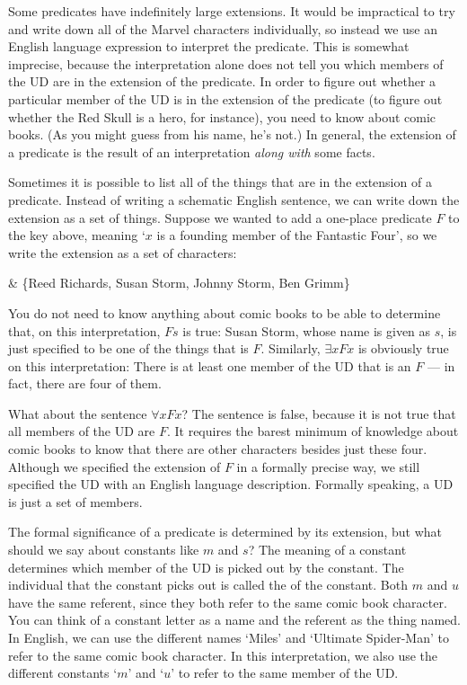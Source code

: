 Some predicates have indefinitely large extensions. It would be impractical to try and write down all of the Marvel characters individually, so instead we use an English language expression to interpret the predicate. This is somewhat imprecise, because the interpretation alone does not tell you which members of the UD are in the extension of the predicate. In order to figure out whether a particular member of the UD is in the extension of the predicate (to figure out whether the Red Skull is a hero, for instance), you need to know about comic books. (As you might guess from his name, he's not.) In general, the extension of a predicate is the result of an interpretation \emph{along with} some facts.

Sometimes it is possible to list all of the things that are in the extension of a predicate. Instead of writing a schematic English sentence, we can write down the extension as a set of things. Suppose we wanted to add a one-place predicate $F$ to the key above, meaning `$x$ is a founding member of the Fantastic Four', so we write the extension as a set of characters:
\begin{partialmodel}
	 & \{Reed Richards, Susan Storm, Johnny Storm, Ben Grimm\}
\end{partialmodel}

You do not need to know anything about comic books to be able to determine that, on this interpretation, $Fs$ is true: Susan Storm, whose name is given as $s$, is just specified to be one of the things that is $F$. Similarly, $\exists x Fx$ is obviously true on this interpretation: There is at least one member of the UD that is an $F$ --- in fact, there are four of them.

What about the sentence $\forall x Fx$? The sentence is false, because it is not true that all members of the UD are $F$. It requires the barest minimum of knowledge about comic books to know that there are other characters besides just these four. Although we specified the extension of $F$ in a formally precise way, we still specified the UD with an English language description. Formally speaking, a UD is just a set of members.

The formal significance of a predicate is determined by its extension, but what should we say about constants like $m$ and $s$? The meaning of a constant determines which member of the UD is picked out by the constant. The individual that the constant picks out is called the  of the constant. Both $m$ and $u$ have the same referent, since they both refer to the same comic book character. You can think of a constant letter as a name and the referent as the thing named. In English, we can use the different names `Miles' and `Ultimate Spider-Man' to refer to the same comic book character. In this interpretation, we also use the different constants `$m$' and `$u$' to refer to the same member of the UD.

